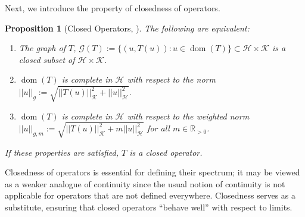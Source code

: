 \documentclass[11pt]{article}
\newtheorem{prop}[theorem]{Proposition}
\theoremstyle{definition}
\theoremstyle{remark}
\DeclareMathOperator\dom{dom}
\newcommand{\Hh}{\mathcal{H}}
\newcommand{\Kk}{\mathcal{K}}
\newcommand{\Gg}{\mathcal{G}}
\newcommand{\R}{\mathbb{R}}
\begin{document}
Next, we introduce the property of closedness of operators.

\begin{prop}[Closed Operators, \citet{schroedingerop}] \label{def:closedop}
    The following are equivalent:
    \begin{enumerate}
        \item[(a)] The graph of $T$, $\Gg(T):=\{(u,T(u)): u \in \dom(T)\} \subset \Hh \times \Kk$ is a closed subset of $\Hh \times \Kk$.
        \item[(b)] $\dom(T)$ is complete in $\Hh$ with respect to the norm $\displaystyle ||u||_g:= \sqrt{||T(u)||^2_\Kk + ||u||^2_\Hh}.$
        \item[(c)] $\dom(T)$ is complete in $\Hh$ with respect to the weighted norm $\displaystyle ||u||_{g,m}:= \sqrt{||T(u)||^2_\Kk + m||u||^2_\Hh}$ for all $m \in \R_{> 0}$.
    \end{enumerate}
    If these properties are satisfied, $T$ is a \emph{closed} operator.
\end{prop}
Closedness of operators is essential for defining their spectrum; it may be viewed as a weaker analogue of continuity since the usual notion of continuity is not applicable for operators that are not defined everywhere. Closedness serves as a substitute, ensuring that closed operators ``behave well'' with respect to limits.
\end{document}

